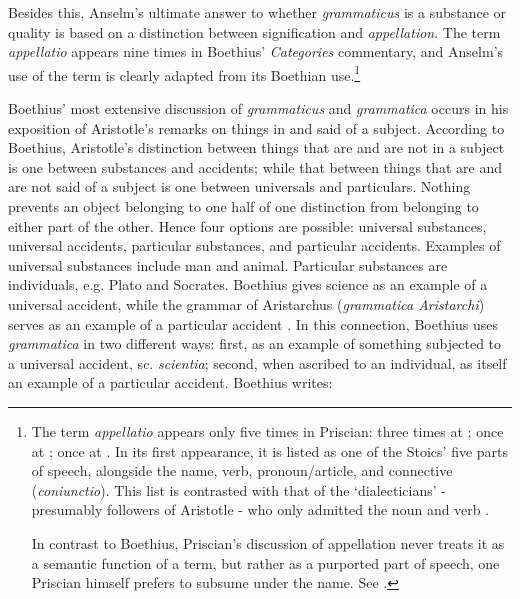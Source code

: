 \documentclass[]{article}
\begin{document}
Besides this, Anselm's ultimate answer to whether \textit{grammaticus} is a substance or quality is based on a distinction between signification and \textit{appellation}. The term \textit{appellatio} appears nine times in Boethius' \textit{Categories} commentary, and Anselm's use of the term is clearly adapted from its Boethian use.\footnote{The term \textit{appellatio} appears only five times in Priscian: three times at \cite[\textit{inst. gram.} II, pp. 54-55]{inst.gram.}; once at \cite[VIII, p. 443]{inst.gram.}; once at \cite[XI, p. 548]{inst.gram.}. In its first appearance, it is listed as one of the Stoics' five parts of speech, alongside the name, verb, pronoun/article, and connective (\textit{coniunctio}). This list is contrasted with that of the `dialecticians' - presumably followers of Aristotle - who only admitted the noun and verb \cite[\textit{inst. gram.} II, p. 54]{inst.gram.}.

In contrast to Boethius, Priscian's discussion of appellation never treats it as a semantic function of a term, but rather as a purported part of speech, one Priscian himself prefers to subsume under the name. See \cite[\textit{inst. gram.} II. p. 55]{inst.gram.}.}

Boethius' most extensive discussion of \textit{grammaticus} and \textit{grammatica} occurs in his exposition of Aristotle's remarks on things in and said of a subject. According to Boethius, Aristotle's distinction between things that are and are not in a subject is one between substances and accidents; while that between things that are and are not said of a subject is one between universals and particulars.  Nothing prevents an object belonging to one half of one distinction from belonging to either part of the other. Hence four options are possible: universal substances, universal accidents, particular substances, and particular accidents. Examples of universal substances include man and animal. Particular substances are individuals, e.g. Plato and Socrates. Boethius gives science as an example of a universal accident, while the grammar of Aristarchus (\textit{grammatica Aristarchi}) serves as an example of a particular accident \cite[BC169C-170C; 171D]{BC}. In this connection, Boethius uses \textit{grammatica} in two different ways: first, as an example of something subjected to a universal accident, sc. \textit{scientia}; second, when ascribed to an individual, as itself an example of a particular accident. Boethius writes:
\end{document}
